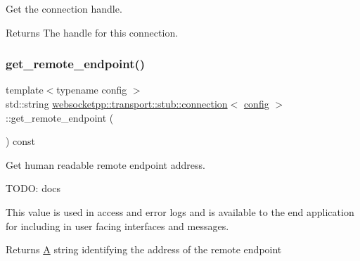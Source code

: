 Get the connection handle. 

\begin{DoxyReturn}{Returns}
The handle for this connection. 
\end{DoxyReturn}
\mbox{\label{classwebsocketpp_1_1transport_1_1stub_1_1connection_a7e7692636f506e0b504b4839bfc71c6c}} 
\subsubsection{\texorpdfstring{get\+\_\+remote\+\_\+endpoint()}{get\_remote\_endpoint()}}
{\footnotesize\ttfamily template$<$typename config $>$ \\
std\+::string \mbox{\hyperlink{classwebsocketpp_1_1transport_1_1stub_1_1connection}{websocketpp\+::transport\+::stub\+::connection}}$<$ \mbox{\hyperlink{classconfig}{config}} $>$\+::get\+\_\+remote\+\_\+endpoint (\begin{DoxyParamCaption}{ }\end{DoxyParamCaption}) const\hspace{0.3cm}{\ttfamily [inline]}}



Get human readable remote endpoint address. 

T\+O\+DO\+: docs

This value is used in access and error logs and is available to the end application for including in user facing interfaces and messages.

\begin{DoxyReturn}{Returns}
\mbox{\hyperlink{struct_a}{A}} string identifying the address of the remote endpoint 
\end{DoxyReturn}
\mbox{\label{classwebsocketpp_1_1transport_1_1stub_1_1connection_ae0cc258a1ca2f1a63ac3706f89bb1bb5}} 
